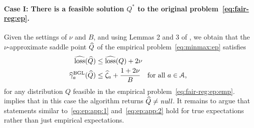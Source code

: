 \paragraph{Case I: There is a feasible solution $Q^*$ to the original problem~\eqref{eq:fair-reg:ep}.}
Given the settings of $\nu$ and $B$, and using Lemmas 2 and 3 of \citet{agarwal2018reductions}, we obtain that the $\nu$-approximate saddle point $\widehat{Q}$ of the empirical problem~\eqref{eq:minmax:ep} satisfies
%
\begin{align}
\label{eq:ep:app:1}
  \widehat{\textup{\mdseries loss}}(\widehat{Q})
  &\le
  \widehat{\textup{\mdseries loss}}(Q) + 2\nu
\\
\label{eq:ep:app:2}
  \widehat{\gamma}^{\textup{BGL}}_a(\widehat{Q})
  &
  \le
  \widehat{\zeta}_a + \frac{1+2\nu}{B}
  \quad
  \text{for all $a\in\mathcal{A}$,}
\end{align}
%
for any distribution $Q$ feasible in the empirical problem~\eqref{eq:fair-reg:ep:emp}.  implies that in this case the algorithm returns $\widehat{Q}\ne\textit{\mdseries null}$. It remains to argue that statements similar
to~\eqref{eq:ep:app:1} and~\eqref{eq:ep:app:2} hold for true expectations rather than just empirical expectations.

